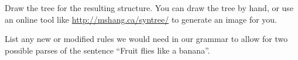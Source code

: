 \documentclass[11pt,letterpaper,boxed]{hmcpset}
\begin{document}
\begin{problem}
Draw the tree for the resulting structure. You can draw the tree by
hand, or use an online tool like \url{http://mshang.ca/syntree/} to
generate an image for you.
\end{problem}
\begin{solution}
\vspace{8cm}
\end{solution}

\begin{problem}
List any new or modified rules we would need in our grammar to allow for two possible
parses of the sentence ``Fruit flies like a banana''.
\end{problem}
\begin{solution}
\vspace{6cm}
\end{solution}
\end{document}

